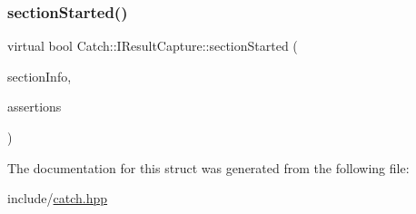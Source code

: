 \mbox{\label{struct_catch_1_1_i_result_capture_a5b76ed52badcb64cf374202e12b81a03}} 
\subsubsection{\texorpdfstring{sectionStarted()}{sectionStarted()}}
{\footnotesize\ttfamily virtual bool Catch\+::\+I\+Result\+Capture\+::section\+Started (\begin{DoxyParamCaption}\item[{\mbox{\hyperlink{struct_catch_1_1_section_info}{Section\+Info}} const \&}]{section\+Info,  }\item[{\mbox{\hyperlink{struct_catch_1_1_counts}{Counts}} \&}]{assertions }\end{DoxyParamCaption})\hspace{0.3cm}{\ttfamily [pure virtual]}}



The documentation for this struct was generated from the following file\+:\begin{DoxyCompactItemize}
\item 
include/\mbox{\hyperlink{catch_8hpp}{catch.\+hpp}}\end{DoxyCompactItemize}
